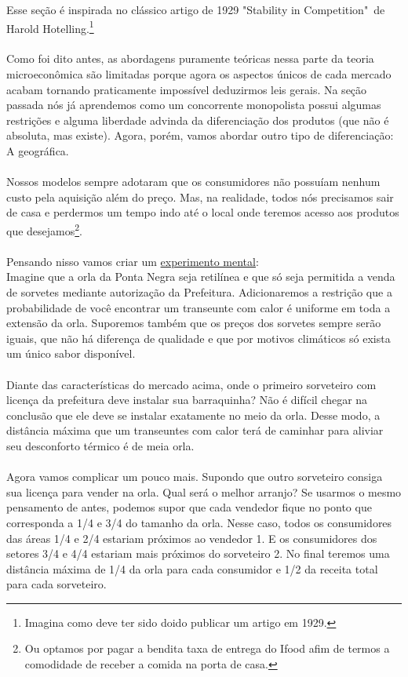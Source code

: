 \documentclass[a4paper,11pt,oneside]{book}
\theoremstyle{definition}
\theoremstyle{break}
\begin{document}
Esse seção é inspirada no clássico artigo de 1929 "Stability in Competition"\ de Harold Hotelling.\footnote{Imagina como deve ter sido doido publicar um artigo em 1929.}
\\~\\
Como foi dito antes, as abordagens puramente teóricas nessa parte da teoria microeconômica são limitadas porque agora os aspectos únicos de cada mercado acabam tornando praticamente impossível deduzirmos leis gerais. Na seção passada nós já aprendemos como um concorrente monopolista possui algumas restrições e alguma liberdade advinda da diferenciação dos produtos (que não é absoluta, mas existe). Agora, porém, vamos abordar outro tipo de diferenciação: A geográfica.
\\~\\
Nossos modelos sempre adotaram que os consumidores não possuíam nenhum custo pela aquisição além do preço. Mas, na realidade, todos nós precisamos sair de casa e perdermos um tempo indo até o local onde teremos acesso aos produtos que desejamos\footnote{Ou optamos por pagar a bendita taxa de entrega do Ifood afim de termos a comodidade de receber a comida na porta de casa.}.
\\~\\
Pensando nisso vamos criar um \href{https://en.wikipedia.org/wiki/Thought_experiment}{experimento mental}:
\\
Imagine que a orla da Ponta Negra seja retilínea e que só seja permitida a venda de sorvetes mediante autorização da Prefeitura. Adicionaremos a restrição que a probabilidade de você encontrar um transeunte com calor é uniforme em toda a extensão da orla. Suporemos também que os preços dos sorvetes sempre serão iguais, que não há diferença de qualidade e que por motivos climáticos só exista um único sabor disponível.
\\~\\
Diante das características do mercado acima, onde o primeiro sorveteiro com licença da prefeitura deve instalar sua barraquinha? Não é difícil chegar na conclusão que ele deve se instalar exatamente no meio da orla. Desse modo, a distância máxima que um transeuntes com calor terá de caminhar para aliviar seu desconforto térmico é de meia orla.
\\~\\
Agora vamos complicar um pouco mais. Supondo que outro sorveteiro consiga sua licença para vender na orla. Qual será o melhor arranjo? Se usarmos o mesmo pensamento de antes, podemos supor que cada vendedor fique no ponto que corresponda a 1/4 e 3/4 do tamanho da orla. Nesse caso, todos os consumidores das áreas 1/4 e 2/4 estariam próximos ao vendedor 1. E os consumidores dos setores 3/4 e 4/4 estariam mais próximos do sorveteiro 2. No final teremos uma distância máxima de 1/4 da orla para cada consumidor e 1/2 da receita total para cada sorveteiro.
\end{document}
